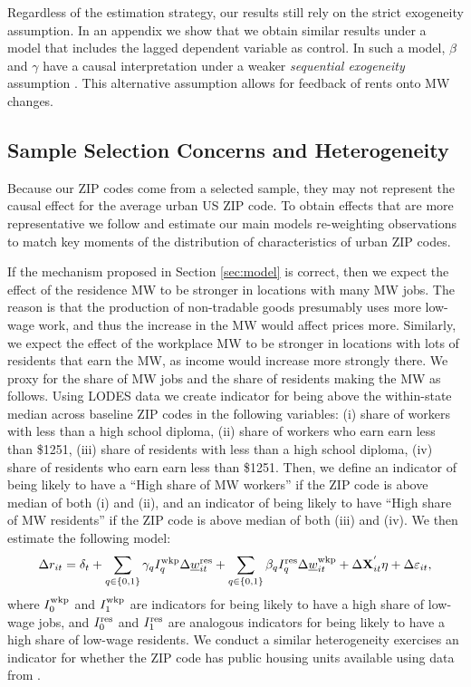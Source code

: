 Regardless of the estimation strategy, our results still rely on the 
strict exogeneity assumption.
In an appendix we show that we obtain similar results under a model that 
includes the lagged dependent variable as control.
In such a model, $\beta$ and $\gamma$ have a causal interpretation under a 
weaker \textit{sequential exogeneity} assumption
\parencite{ArellanoBond1991, ArellanoHonore2001}.
This alternative assumption allows for feedback of rents onto MW changes.


\subsection{Sample Selection Concerns and Heterogeneity}\label{sec:emp_start_heterogeneity}

Because our ZIP codes come from a selected sample, they may not represent
the causal effect for the average urban US ZIP code.
To obtain effects that are more representative we follow 
\textcite{Hainmueller2012} and estimate our main models re-weighting 
observations to match key moments of the distribution of characteristics of 
urban ZIP codes.

If the mechanism proposed in Section \ref{sec:model} is correct, then we
expect the effect of the residence MW to be stronger in locations with many 
MW jobs.
The reason is that the production of non-tradable goods presumably uses more
low-wage work, and thus the increase in the MW would affect prices more.
Similarly, we expect the effect of the workplace MW to be stronger in locations
with lots of residents that earn the MW, as income would increase more strongly 
there.
We proxy for the share of MW jobs and the share of residents making the MW as follows.
Using LODES data we create indicator for being above the within-state 
median across baseline ZIP codes in the following variables: (i) share of workers 
with less than a high school diploma, (ii) share of workers who earn earn less 
than \$1251, (iii) share of residents with less than a high school diploma, (iv) 
share of residents who earn earn less than \$1251.
Then, we define an indicator of being likely to have a ``High share of MW workers'' 
if the ZIP code is above median of both (i) and (ii), and an indicator of being likely 
to have ``High share of MW residents'' if the ZIP code is above median of both (iii) and 
(iv). We then estimate the following model:
\begin{equation}\label{eq:fd_heterogeneity}
    \Delta r_{it} = \delta_t
                  + \sum_{q\in\{0,1\}}\gamma_q I^{\text{wkp}}_q \Delta \underline{w}^{\text{res}}_{it}
                  + \sum_{q\in\{0,1\}}\beta_q I^{\text{res}}_q \Delta \underline{w}^{\text{wkp}}_{it}
                  + \Delta \mathbf{X}^{'}_{it}\eta
                  + \Delta \varepsilon_{it} ,
\end{equation}
where 
$I^{\text{wkp}}_0$ and $I^{\text{wkp}}_1$ are indicators for being likely to have a
high share of low-wage jobs, and
$I^{\text{res}}_0$ and $I^{\text{res}}_1$ are analogous indicators for being likely to 
have a high share of low-wage residents.
We conduct a similar heterogeneity exercises an indicator for whether the ZIP
code has public housing units available using data from \textcite{hudHousing}.
